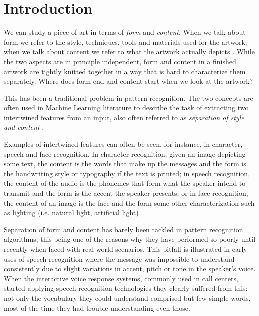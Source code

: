 
\chapter{Introduction}
\label{sec:intro}


We can study a piece of art in terms of \emph{form} and \emph{content}.
When we talk about form we refer to the style, techniques, tools and materials used for the artwork; when we talk about content we refer to what the artwork actually depicts \cite{Esaak}.
While the two aspects are in principle independent, form and content in a finished artwork are tightly knitted together in a way that is hard to characterize them separately. Where does form end and content start when we look at the artwork?

This has been a traditional problem in pattern recognition.
The two concepts are often used in Machine Learning literature to describe the task of extracting two intertwined features from an input, also often referred to as \emph{separation of style and content} \cite{Tenenbaum1997,Tenenbaum2000}.

Examples of intertwined features can often be seen, for instance, in character, speech and face recognition.
In character recognition, given an image depicting some text, the content is the words that make up the messages and the form is the handwriting style or typography if the text is printed; in speech recognition, the content of the audio is the phonemes that form what the speaker intend to transmit and the form is the accent the speaker presents; or in face recognition, the content of an image is the face and the form some other characterization such as lighting (i.e. natural light, artificial light)

Separation of form and content has barely been tackled in pattern recognition algorithms, this being one of the reasons why they have performed so poorly until recently when faced with real-world scenarios.
This pitfall is illustrated in early uses of speech recognition where the message was impossible to understand consistently due to slight variations in accent, pitch or tone in the speaker's voice.
When the interactive voice response systems, commonly used in call centers, started applying speech recognition technologies they clearly suffered from this: not only the vocabulary they could understand comprised but few simple words, most of the time they had trouble understanding even those.


